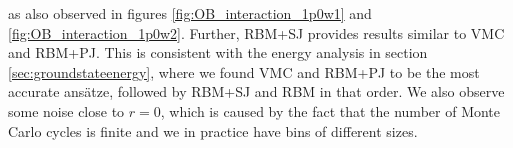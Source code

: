 \noindent
as also observed in figures \eqref{fig:OB_interaction_1p0w1} and \eqref{fig:OB_interaction_1p0w2}. Further, RBM+SJ provides results similar to VMC and RBM+PJ. This is consistent with the energy analysis in section \ref{sec:groundstateenergy}, where we found VMC and RBM+PJ to be the most accurate ansätze, followed by RBM+SJ and RBM in that order. We also observe some noise close to $r=0$, which is caused by the fact that the number of Monte Carlo cycles is finite and we in practice have bins of different sizes.

\begin{figure}
	\centering
	\captionsetup[subfigure]{labelformat=empty}
	\hspace{0.1cm}
	\hspace{-0.5cm}
	\\
	

\end{figure}
